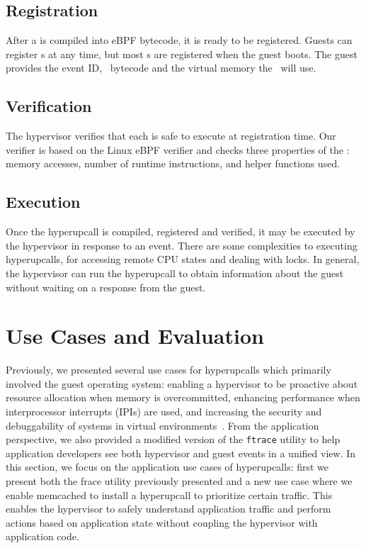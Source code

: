 \documentclass[11pt]{article}
\begin{document}
\subsection{Registration}
\label{sec:registration}

After a \hypercallback{} is compiled into eBPF bytecode, it is ready to
be registered. Guests can register \hypercallback{}s at any time, but
most \hypercallback{}s are registered when the guest boots. The guest
provides the \hypercallback{} event ID, \hypercallback~bytecode and 
the virtual memory the \hypercallback~will use. 

\subsection{Verification}
\label{sec:verification}

The hypervisor verifies that each \hypercallback{} is safe to
execute at registration time. Our verifier is based on the Linux 
eBPF verifier and checks three properties of the \hypercallback: 
memory accesses, number of runtime instructions, and helper functions
used. 


\subsection{Execution}
\label{sec:execution}

Once the hyperupcall is compiled, registered and verified, it may be executed by the hypervisor in response to an event.
There are some complexities to executing hyperupcalls, for accessing remote CPU states and dealing with locks. In general, the hypervisor can run the hyperupcall to obtain information about
the guest without waiting on a response from the guest.


\section{Use Cases and Evaluation}
\label{sec:evaluation}
Previously, we presented several use cases for hyperupcalls which primarily involved the guest operating system: enabling a hypervisor to be proactive about resource
allocation when memory is overcommitted, enhancing performance when interprocessor interrupts (IPIs)
are used, and increasing the security and debuggability of systems in virtual environments~\cite{amit2018design}. From the 
application perspective, we also provided a modified version of the \texttt{ftrace} utility to help application developers
see both hypervisor and guest events in a unified view. In this section, we focus on the application use cases
of hyperupcalls: first we present both the frace utility previously presented and a new use case where
we enable memcached to install a hyperupcall to prioritize certain traffic. This enables the hypervisor
to safely understand application traffic and perform actions based on application state without coupling
the hypervisor with application code.
\end{document}
